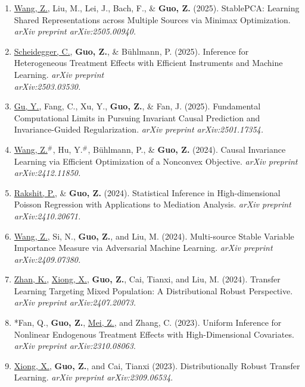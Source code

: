 \documentclass[margin, line]{res}
\begin{document}
\begin{resume}
\begin{enumerate}
			\item \underline{Wang, Z.}, Liu, M., Lei, J., Bach, F.\Envelope, \& {\bf Guo, Z.}\Envelope
				(2025). StablePCA: Learning Shared Representations across Multiple
				Sources via Minimax Optimization. {\it arXiv preprint arXiv:2505.00940.}

			\item \underline{Scheidegger, C.}, {\bf Guo, Z.}, \& Bühlmann, P. (2025). Inference
				for Heterogeneous Treatment Effects with Efficient Instruments and Machine
				Learning. {\it arXiv preprint\\ arXiv:2503.03530.}

			\item \underline{Gu, Y.}, Fang, C., Xu, Y., {\bf Guo, Z.}, \& Fan, J. (2025).
				Fundamental Computational Limits in Pursuing Invariant Causal Prediction
				and Invariance-Guided Regularization.
				{\it arXiv preprint arXiv:2501.17354.}

			\item \underline{Wang, Z.}$^{\#}$, Hu, Y.$^{\#}$, Bühlmann, P., \& {\bf Guo, Z.}
				(2024). Causal Invariance Learning via Efficient Optimization of a
				Nonconvex Objective. {\it arXiv preprint arXiv:2412.11850.}

			\item \underline{Rakshit, P.}, \& {\bf Guo, Z.} (2024). Statistical
				Inference in High-dimensional Poisson Regression with Applications to
				Mediation Analysis. {\it arXiv preprint arXiv:2410.20671.}

			\item \underline{Wang, Z.}, Si, N., {\bf Guo, Z.}, and Liu, M. (2024).
				Multi-source Stable Variable Importance Measure via Adversarial Machine
				Learning. {\it arXiv preprint arXiv:2409.07380.}

			\item \underline{Zhan, K.}, \underline{Xiong, X.}, {\bf Guo, Z.}, Cai, Tianxi,
				and Liu, M. (2024). Transfer Learning Targeting Mixed Population: A
				Distributional Robust Perspective. {\it arXiv preprint arXiv:2407.20073.}

			\item {*}Fan, Q., {\bf Guo, Z.}, \underline{Mei, Z.}, and Zhang, C. (2023).
				Uniform Inference for Nonlinear Endogenous Treatment Effects with High-Dimensional
				Covariates. {\it arXiv preprint arXiv:2310.08063}.

			\item \underline{Xiong, X.}, {\bf Guo, Z.}\Envelope, and Cai, Tianxi
				\Envelope(2023). Distributionally Robust Transfer Learning. {\it arXiv preprint arXiv:2309.06534}.


\end{enumerate}
\end{resume}
\end{document}
